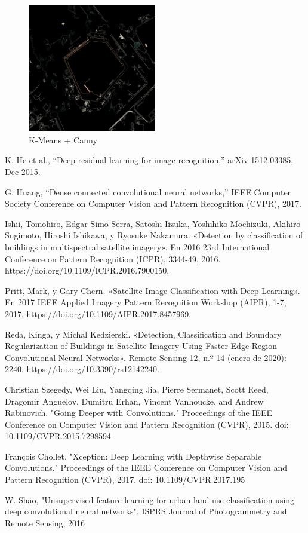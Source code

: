 \documentclass[article]{llncs}
\begin{document}
\begin{figure}[h]
  \centering
  \includegraphics[width=0.5\textwidth]{canny.png}
  \caption{K-Means + Canny}
  \label{fig:canny}
\end{figure}

\begin{thebibliography}{8}
        K. He et al., “Deep residual learning for image recognition,” arXiv 1512.03385, Dec 2015.
  
        G. Huang, “Dense connected convolutional neural networks,” IEEE Computer Society Conference on Computer Vision and Pattern Recognition (CVPR), 2017.
    
        Ishii, Tomohiro, Edgar Simo-Serra, Satoshi Iizuka, Yoshihiko Mochizuki, Akihiro Sugimoto, Hiroshi Ishikawa, y Ryosuke Nakamura. «Detection by classification of buildings in multispectral satellite imagery». En 2016 23rd International Conference on Pattern Recognition (ICPR), 3344-49, 2016. https://doi.org/10.1109/ICPR.2016.7900150.
    
        Pritt, Mark, y Gary Chern. «Satellite Image Classification with Deep Learning». En 2017 IEEE Applied Imagery Pattern Recognition Workshop (AIPR), 1-7, 2017. https://doi.org/10.1109/AIPR.2017.8457969.

        Reda, Kinga, y Michal Kedzierski. «Detection, Classification and Boundary Regularization of Buildings in Satellite Imagery Using Faster Edge Region Convolutional Neural Networks». Remote Sensing 12, n.º 14 (enero de 2020): 2240. https://doi.org/10.3390/rs12142240.

        Christian Szegedy, Wei Liu, Yangqing Jia, Pierre Sermanet, Scott Reed, Dragomir Anguelov, Dumitru Erhan, Vincent Vanhoucke, and Andrew Rabinovich. "Going Deeper with Convolutions." Proceedings of the IEEE Conference on Computer Vision and Pattern Recognition (CVPR), 2015. doi: 10.1109/CVPR.2015.7298594

        François Chollet. "Xception: Deep Learning with Depthwise Separable Convolutions." Proceedings of the IEEE Conference on Computer Vision and Pattern Recognition (CVPR), 2017. doi: 10.1109/CVPR.2017.195

        W. Shao, "Unsupervised feature learning for urban land use classification using deep convolutional neural networks", ISPRS Journal of Photogrammetry and Remote Sensing, 2016
  \end{thebibliography}
\end{document}
